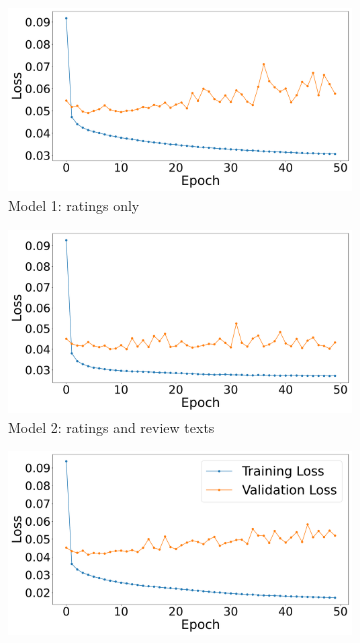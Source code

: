 \begin{figure}[h]
    \centering
    \begin{subfigure}{0.49\textwidth}
        \centering
        \includegraphics[width=\linewidth]{Figures/ncf_training_1_sample.pdf} %
        \caption{Model 1: ratings only}
        \label{fig:model1_sample} 
    \end{subfigure}
    \hfill
    \begin{subfigure}{0.49\textwidth}
        \centering
        \includegraphics[width=\linewidth]{Figures/ncf_training_2_sample.pdf} %
        \caption{Model 2: ratings and review texts}
        \label{fig:model2_sample}
    \end{subfigure}
    \hfill
    \begin{subfigure}{0.49\textwidth}
        \centering
        \includegraphics[width=\linewidth]{Figures/ncf_training_3_sample.pdf} %

\end{subfigure}
\end{figure}
